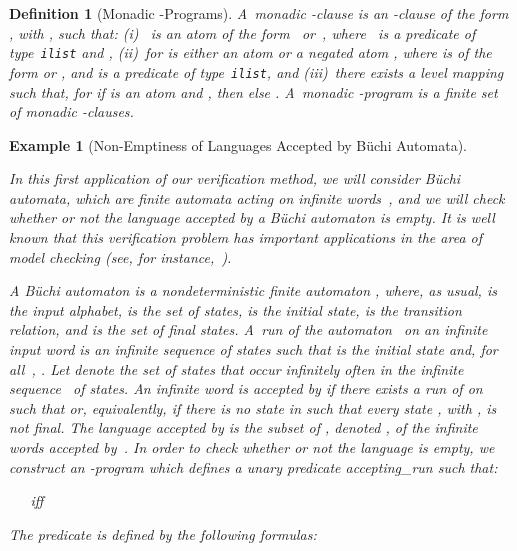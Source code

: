 \documentclass[english]{tlp}
\newtheorem{definition}{Definition} \newtheorem{example}{Example}       \newtheorem{remark}{Remark}
\begin{document}
\begin{definition} [Monadic -Programs]
\label{def:monadic_omega_programs}\rm A~{\em monadic}
\mbox{-clause} is an -clause of the form
, with , such
that: (i)~ is an atom of the form~ or~,
where~ is a predicate of type~\texttt{ilist} and
, (ii)~for   is either an atom
 or a negated atom , where  is of the form 
or , and  is a predicate of type~\texttt{ilist}, and
(iii)~there exists a level mapping  such that, for
 if  is an atom and
, then
 else . A~{\em monadic
-program} is a finite set of monadic -clauses.
\end{definition}

\vspace*{-2mm}

\begin{example}[Non-Emptiness of Languages Accepted by B\"{u}chi Automata]
\label{ex:buechi}

In this first application of our verification method,
we will consider {\em B\"{u}chi automata},
which are finite automata acting on infinite words~\cite{Tho90}, 
and we will check whether or not the language 
accepted by a {B\"{u}chi automaton} is empty. 
It is
well known that this verification problem has important applications
in the area of model checking (see, for instance,~\cite{Cl&99}).

A {\em B\"{u}chi automaton}  is a nondeterministic finite automaton
 , where, as usual,  is the input
alphabet,  is the set of states,  is the initial state,
 is the transition
relation, and  is the set of final states. A~{\em run} of the
automaton~ on an infinite input word
 is an infinite sequence
 of states such that 
is the initial state  and, for all~, . Let 
denote the set of states that occur infinitely often in the
infinite sequence~ of states. An infinite word
 is {\em accepted} by  if there
exists a run  of  on  such that
 or, equivalently, if there is
no state  in  such that every  state ,
with , is not final. The {\em language accepted} by 
is the subset of , denoted , of the
infinite words accepted by~.
In order to check whether or not the language  is
empty, we construct an -program which defines a unary predicate 
{\it{accepting\_run}} such that:

\smallskip
\noindent\makebox[5mm][l]{}~~~iff~~

\smallskip
\noindent The predicate  is defined by the
following formulas:

\smallskip
\noindent\makebox[5mm][l]{()}~

\smallskip
\noindent{}~\\
\noindent\makebox[9mm][l]{} 


\end{example}
\end{document}
